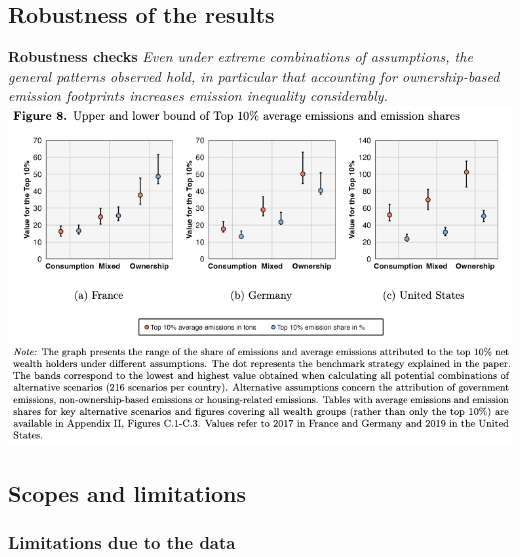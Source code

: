 \documentclass[10pt]{beamer}
\begin{document}
\subsection{Robustness of the results}
\begin{frame}{\subsecname}
    \textbf{Robustness checks}
    \textit{Even under extreme combinations of assumptions, the general patterns observed hold, in particular that accounting for ownership-based emission footprints increases emission inequality considerably.}
    \includegraphics[width=1\linewidth]{../Figures/Figure_8.png}
\end{frame}

\subsection{Scopes and limitations}

\subsubsection{Limitations due to the data}
\end{document}
